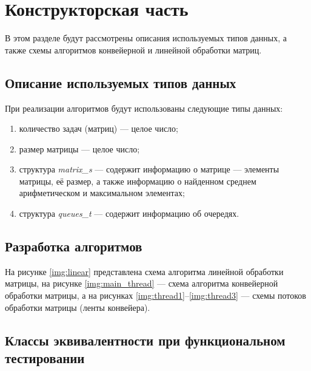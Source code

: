 \chapter{Конструкторская часть}
В этом разделе будут рассмотрены описания используемых типов данных, а также схемы алгоритмов конвейерной и линейной обработки матриц.

\section{Описание используемых типов данных}

При реализации алгоритмов будут использованы следующие типы данных:

\begin{enumerate}[label=\arabic*)]
	\item количество задач (матриц) --- целое число;
	\item размер матрицы --- целое число;
	\item структура \textit{matrix\_s} --- содержит информацию о матрице --- элементы матрицы, её размер, а также информацию о найденном среднем арифметическом и максимальном элементах;
	\item структура \textit{queues\_t} --- содержит информацию об очередях.
\end{enumerate}

\section{Разработка алгоритмов}
На рисунке \ref{img:linear} представлена схема алгоритма линейной обработки матрицы, на рисунке \ref{img:main_thread} --- схема алгоритма конвейерной обработки матрицы, а на рисунках \ref{img:thread1}--\ref{img:thread3} --- схемы потоков обработки матрицы (ленты конвейера).
\clearpage
{}
\clearpage
{}
\clearpage
{}
\clearpage
{}
\clearpage
{}
\clearpage


\section{Классы эквивалентности при функциональном тестировании}

